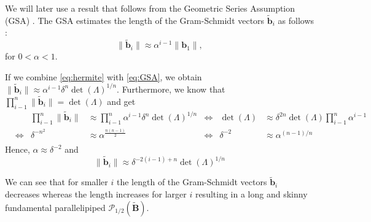 We will later use a result that follows from the Geometric Series Assumption (GSA) \cite{Gop16}. The GSA estimates the length of the Gram-Schmidt vectors $\tilde{\mathbf{b}}_i$ as follows \cite{Sch03}: \label{sec:GSA} %
\begin{equation} \label{eq:GSA}
  \| \tilde{\mathbf{b}}_i \| \approx \alpha^{i-1} \| \mathbf{b}_1 \|,
\end{equation}
for $0 < \alpha < 1$.

If we combine \cref{eq:hermite} with \cref{eq:GSA}, we obtain  $\| \tilde{\mathbf{b}}_i \| \approx \alpha^{i-1} \delta^n \det(\Lambda)^{1/n}$. Furthermore, we know that $\prod_{i-1}^n \| \tilde{\mathbf{b}}_i \| = \det(\Lambda)$  %
and get
\begin{align}
   &                 & \prod_{i-1}^n \| \tilde{\mathbf{b}}_i \| & \approx \prod_{i-1}^n \alpha^{i-1} \delta^n \det(\Lambda)^{1/n}
   & \Leftrightarrow & \det(\Lambda)                            & \approx \delta^{2n} \det(\Lambda) \prod_{i-1}^n \alpha^{i-1}    \\
   & \Leftrightarrow & \delta^{-n^2}                            & \approx \alpha^{\frac{n(n-1)}{2}}
   & \Leftrightarrow & \delta^{-2}                              & \approx \alpha^{(n-1)/n}                                        \\
\end{align}
Hence, $\alpha \approx \delta^{-2}$ and
\begin{equation}
  \| \tilde{\mathbf{b}}_i \| \approx \delta^{-2(i-1) + n} \det(\Lambda)^{1/n}
\end{equation}

We can see that for smaller $i$ the length of the Gram-Schmidt vectors $\tilde{\mathbf{b}}_i$ decreases whereas the length increases for larger $i$ resulting in a long and skinny fundamental parallelipiped $\mathcal{P}_{1/2}(\tilde{\mathbf{B}})$.





